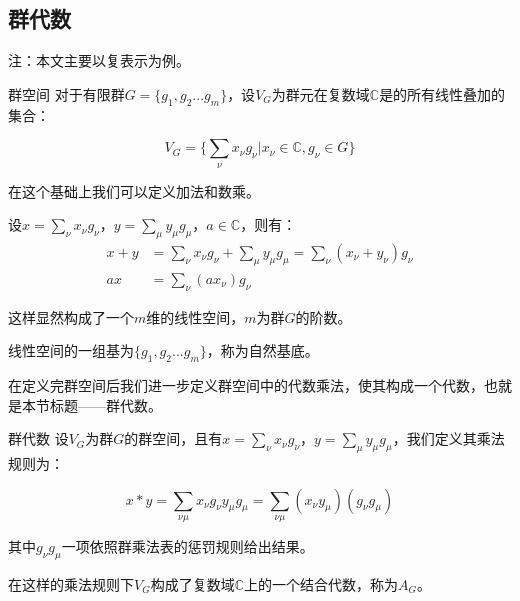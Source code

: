 

\subsection{群代数}

注：本文主要以复表示为例。

\begin{definition}{群空间}
对于有限群$G=\{g_1,g_2...g_m\}$，设$V_G$为群元在复数域$\mathbb{C}$是的所有线性叠加的集合：

\begin{equation}
V_G=\{\displaystyle\sum_\nu x_\nu g_\nu|x_\nu \in \mathbb{C},g_\nu \in G\}
\end{equation}

在这个基础上我们可以定义加法和数乘。

设$x=\displaystyle\sum_\nu x_\nu g_\nu$，$y=\displaystyle\sum_\mu y_\mu g_\mu$，$a\in \mathbb{C}$，则有：
\begin{align}
x+y&=\displaystyle\sum_\nu x_\nu g_\nu+\displaystyle\sum_\mu y_\mu g_\mu=\displaystyle\sum_\nu(x_\nu+y_\nu)g_\nu\\
ax&=\displaystyle\sum_\nu (ax_\nu) g_\nu
\end{align}

这样显然构成了一个$m$维的线性空间，$m$为群$G$的阶数。

线性空间的一组基为$\{g_1,g_2...g_m\}$，称为自然基底。

\end{definition}

在定义完群空间后我们进一步定义群空间中的代数乘法，使其构成一个代数，也就是本节标题——群代数。

\begin{definition}{群代数}
设$V_G$为群$G$的群空间，且有$x=\displaystyle\sum_\nu x_\nu g_\nu$，$y=\displaystyle\sum_\mu y_\mu g_\mu$，我们定义其乘法规则为：

\begin{equation}
x*y=\displaystyle\sum_{\nu\mu}x_\nu g_\nu y_\mu g_\mu=
\displaystyle\sum_{\nu\mu}(x_\nu y_\mu) (g_\nu g_\mu)
\end{equation}

其中$g_\nu g_\mu$一项依照群乘法表的惩罚规则给出结果。

在这样的乘法规则下$V_G$构成了复数域$\mathbb{C}$上的一个结合代数，称为$A_G$。

\end{definition}

